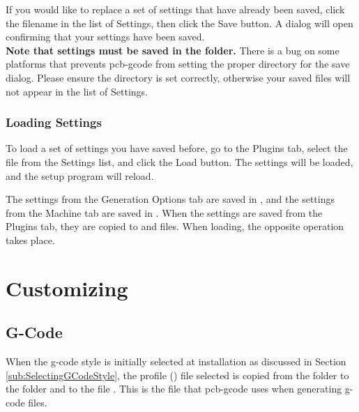 \documentclass[11pt]{book}
\begin{document}
If you would like to replace a set of settings that have already been saved, click the filename in the list of Settings, then click the Save button. A dialog will open confirming that your settings have been saved.
\\

\textbf{Note that settings must be saved in the  folder.}
There is a bug on some platforms that prevents pcb-gcode from setting the proper directory for the save dialog. Please ensure the directory is set correctly, otherwise your saved files will not appear in the list of Settings.
\\

\subsection{Loading Settings}

To load a set of settings you have saved before, go to the Plugins tab, select the file from the Settings list, and click the Load button. The settings will be loaded, and the setup program will reload.

The settings from the Generation Options tab are saved in , and the settings from the Machine tab are saved in . When the settings are saved from the Plugins tab, they are copied to  and  files. When loading, the opposite operation takes place.

%
\chapter{Customizing}
%

%
%
\section{G-Code}\label{sec:CustomizingGCode}

When the g-code style is initially selected at installation as discussed in Section \vref{sub:SelectingGCodeStyle}, the profile () file selected is copied from the  folder to the  folder and to the file . This is the file that pcb-gcode uses when generating g-code files.
\end{document}
